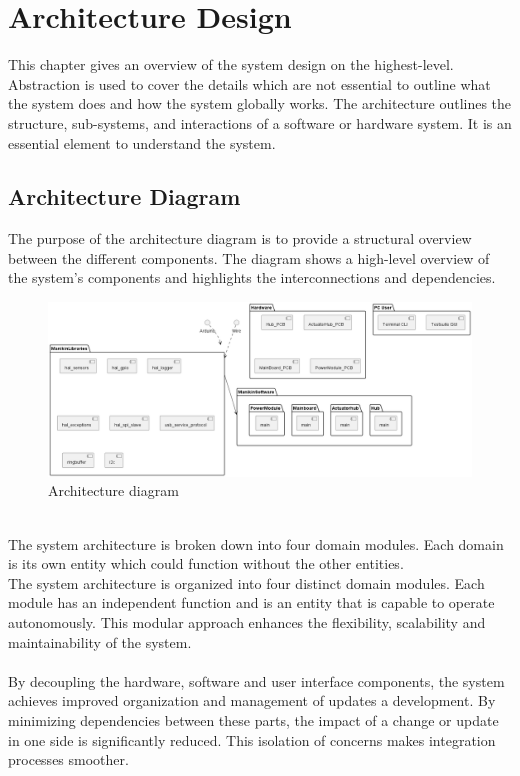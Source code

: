 \chapter{Architecture Design}
\label{chapter:intro}
This chapter gives an overview of the system design on the highest-level. Abstraction is used to cover the details which are not essential to outline what the system does and how the system globally works. \newline
The architecture outlines the structure, sub-systems, and interactions of a software or hardware system. It is an essential element to understand the system. 

\section {Architecture Diagram}
The purpose of the architecture diagram is to provide a structural overview between the different components. The diagram shows a high-level overview of the system's components and highlights the interconnections and dependencies. \\
\begin{figure}[h!]
\includegraphics[scale=0.325]{figures/ArchitectureDiagram.png}
  \caption{Architecture diagram}
\end{figure}\\
The system architecture is broken down into four domain modules. Each domain is its own entity which could function without the other entities.\\
The system architecture is organized into four distinct domain modules. Each module has an independent function and is an entity that is capable to operate autonomously. This modular approach enhances the flexibility, scalability and maintainability of the system. \\\\ 
By decoupling the hardware, software and user interface components, the system achieves improved organization and management of updates a development. By minimizing dependencies between these parts, the impact of a change or update in one side is significantly reduced. This isolation of concerns makes integration processes smoother. 
